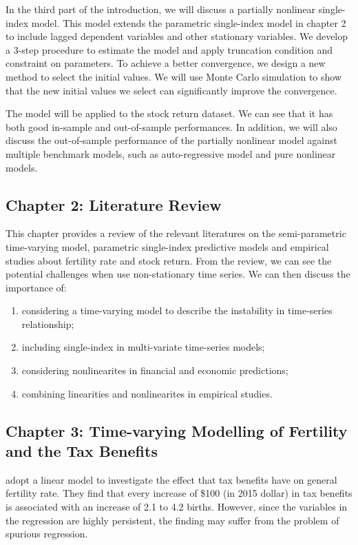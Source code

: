 \documentclass[a4paper,12pt,times,numbered,print,index]{report}
\numberwithin{equation}{section}
\begin{document}
In the third part of the introduction, we will discuss a partially nonlinear single-index model. This model extends the parametric single-index model in chapter 2 to include lagged dependent variables and other stationary variables. We develop a 3-step procedure to estimate the model and apply truncation condition and constraint on parameters. To achieve a better convergence, we design a new method to select the initial values. We will use Monte Carlo simulation to show that the new initial values we select can significantly improve the convergence. 

The model will be applied to the stock return dataset. We can see that it has both good in-sample and out-of-sample performances. In addition, we will also discuss the out-of-sample performance of the partially nonlinear model against multiple benchmark models, such as auto-regressive model and pure nonlinear models. 

\pagebreak

\subsection*{Chapter 2: Literature Review}
This chapter provides a review of the relevant literatures on the semi-parametric time-varying model,  parametric single-index predictive models and empirical studies about fertility rate and stock return. From the review, we can see the potential challenges when use non-stationary time series. We can then discuss the importance of:
\begin{enumerate}
    \item considering a time-varying model to describe the instability in time-series relationship;
    
    \item including single-index in multi-variate time-series models;
    
    \item considering nonlinearites in financial and economic predictions;
    
    \item combining linearities and nonlinearites in empirical studies.
\end{enumerate}

\pagebreak
\subsection*{Chapter 3: Time-varying Modelling of Fertility and the Tax Benefits}
 \cite{whittington1990fertility} adopt a linear model to investigate the effect that tax benefits have on general fertility rate. They find that every increase of \$100 (in 2015 dollar) in tax benefits is associated with an increase of 2.1 to 4.2 births. However, since the variables in the regression are highly persistent, the finding may suffer from the problem of spurious regression. 
 
\end{document}
